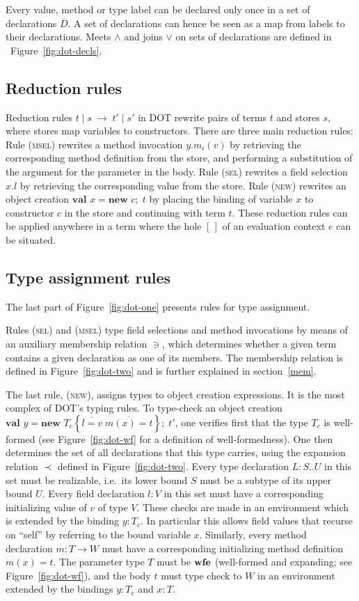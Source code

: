 \documentclass[9pt]{sigplanconf}
\newcommand{\figref}[1]
        {Figure~\ref{fig:#1}}
\newcommand{\expand}{\prec}
\newcommand{\reduces}{\;\rightarrow\;}
\newcommand{\nswfe}{\mbox{\textbf{wfe}}}
\newcommand{\tfun}{\rightarrow}
\newcommand{\ldefs}[1]{\left\{#1\right\}}
\newcommand{\seq}[1]{\overline{#1}}
\newcommand{\mapp}[3]{#1.#2(#3)}
\newcommand{\new}[3]{\textbf{val }#1 = \textbf{new }#2 ;\; #3}
\newcommand{\Ldecl}[3]{#1 : #2..#3}%
\newcommand{\ldecl}[2]{#1 : #2}
\newcommand{\mdecl}[3]{#1 : #2 \tfun #3}
\newcommand{\reduction}[4]{#1 \operatorname{|} #2 \reduces #3 \operatorname{|} #4}
\begin{document}
Every value, method or type label can be declared only once in a set of
declarations $\seq D$. A set of declarations can hence be seen as a map from
labels to their declarations.  Meets $\wedge$ and joins $\vee$ on sets of
declarations are defined in ~\figref{dot-decls}.

\subsection{Reduction rules}

Reduction rules $\reduction t s {t'} {s'}$ in DOT rewrite pairs of
terms $t$ and stores $s$, where stores map variables to constructors.
There are three main reduction rules: Rule (\textsc{msel}) rewrites a
method invocation $\mapp y {m_i} v$ by retrieving the corresponding method
definition from the store, and performing a substitution of the
argument for the parameter in the body. Rule (\textsc{sel}) rewrites a
field selection $x.l$ by retrieving the corresponding value from the
store. Rule (\textsc{new}) rewrites an object creation $\new x c t$ by
placing the binding of variable $x$ to constructor $c$ in the store
and continuing with term $t$.  These reduction rules can be applied
anywhere in a term where the hole $[\,]$ of an evaluation context $e$
can be situated.

\subsection{Type assignment rules}

The last part of \figref{dot-one} presents rules for type
assignment.  

Rules (\textsc{sel}) and (\textsc{msel}) type field selections and
method invocations by means of an auxiliary membership relation $\ni$,
which determines whether a given term contains a given declaration as
one of its members. The membership relation is defined in
\figref{dot-two} and is further explained in section~\ref{mem}.

The last rule, (\textsc{new}), assigns types to object creation
expressions. It is the most complex of DOT's typing rules.  To
type-check an object creation $\new y {T_c \ldefs {\seq{l =
      v}\;\seq{m(x) = t}}} t'$, one verifies first that the type $T_c$
is well-formed (see \figref{dot-wf} for a definition of
well-formedness).  One then determines the set of all declarations
that this type carries, using the expansion relation $\expand$ defined
in \figref{dot-two}.  Every type declaration $\Ldecl L S U$ in
this set must be realizable, i.e.\ its lower bound $S$ must be a
subtype of its upper bound $U$.  Every field declaration $\ldecl l V$
in this set must have a corresponding initializing value of $v$ of
type $V$.  These checks are made in an environment which is extended
by the binding $y: T_c$. In particular this allows field values that
recurse on ``self'' by referring to the bound variable $x$. Similarly,
every method declaration $\mdecl m T W$ must have a corresponding
initializing method definition $m(x) = t$. The parameter type $T$ must
be $\nswfe$ (well-formed and expanding; see \figref{dot-wf}), and
the body $t$ must type check to $W$ in an environment extended by the
bindings $y : T_c$ and $x : T$.
\end{document}
